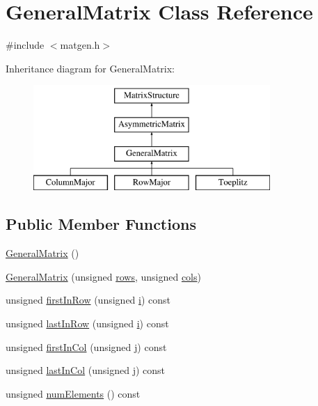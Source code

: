 \hypertarget{classGeneralMatrix}{}\section{General\+Matrix Class Reference}
\label{classGeneralMatrix}


{\ttfamily \#include $<$matgen.\+h$>$}

Inheritance diagram for General\+Matrix\+:\begin{figure}[H]
\begin{center}
\leavevmode
\includegraphics[height=4.000000cm]{classGeneralMatrix}
\end{center}
\end{figure}
\subsection*{Public Member Functions}
\begin{DoxyCompactItemize}
\item 
\hyperlink{classGeneralMatrix_a005084ee9fe6f9418a635ee0779915b2}{General\+Matrix} ()
\item 
\hyperlink{classGeneralMatrix_acc498f3bcd04c3e1cc7cbb0091632d6e}{General\+Matrix} (unsigned \hyperlink{classAsymmetricMatrix_adf8ff298b6b24882a147fdcedebe1bbd}{rows}, unsigned \hyperlink{classAsymmetricMatrix_a5ef0ec381e4d33a1f19be7c3e26410d4}{cols})
\item 
unsigned \hyperlink{classGeneralMatrix_a0dbd87a3506465846237160813b9e59f}{first\+In\+Row} (unsigned \hyperlink{indexexpr_8h_aabd77643995707c185e95c8cb2782c81}{i}) const 
\item 
unsigned \hyperlink{classGeneralMatrix_aa96b69f603eea32b735091e6d4f69374}{last\+In\+Row} (unsigned \hyperlink{indexexpr_8h_aabd77643995707c185e95c8cb2782c81}{i}) const 
\item 
unsigned \hyperlink{classGeneralMatrix_a81da215cc8665147e2be6a1799dcbf29}{first\+In\+Col} (unsigned \hyperlink{indexexpr_8h_aa1f3325d66516548e69238097857fa98}{j}) const 
\item 
unsigned \hyperlink{classGeneralMatrix_a0796f2a1419a569832e44d126789fc56}{last\+In\+Col} (unsigned \hyperlink{indexexpr_8h_aa1f3325d66516548e69238097857fa98}{j}) const 
\item 
unsigned \hyperlink{classGeneralMatrix_a66d62ad381a3fbdb172f7a3cd7accf0f}{num\+Elements} () const 
\end{DoxyCompactItemize}
